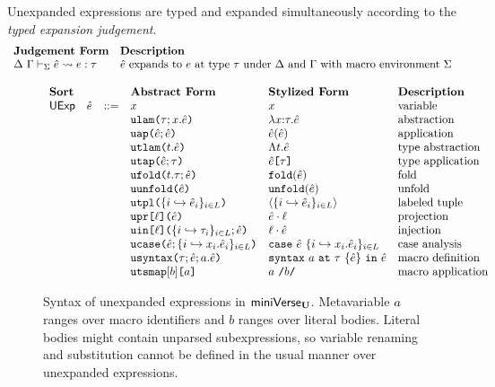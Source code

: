 Unexpanded expressions are typed and expanded simultaneously according to the \emph{typed expansion judgement}. 
\[\begin{array}{ll}
\textbf{Judgement Form} & \textbf{Description}\\
\Delta~\Gamma \vdash_{\Sigma} \hat{e} \leadsto e : \tau & \text{$\hat{e}$ expands to $e$ at type $\tau$ under $\Delta$ and $\Gamma$ with macro environment $\Sigma$}
\end{array}\]

\begin{figure}
$\begin{array}{lllllll}
\textbf{Sort} & & & \textbf{Abstract Form} & \textbf{Stylized Form} & \textbf{Description}\\
\mathsf{UExp} & \hat{e} & ::= & x & x & \text{variable}\\
&&& \texttt{ulam}\texttt{(}\tau; x.\hat{e}\texttt{)} & \lambda x{:}\tau.\hat{e} & \text{abstraction}\\
&&& \texttt{uap}\texttt{(}\hat{e}; \hat{e}\texttt{)} & \hat{e}(\hat{e}) & \text{application}\\
&&& \texttt{utlam}\texttt{(}t.\hat{e}\texttt{)} & \Lambda t.\hat{e} & \text{type abstraction}\\
&&& \texttt{utap}\texttt{(}\hat{e}; \tau\texttt{)} & \hat{e}\texttt{[}\tau\texttt{]} & \text{type application}\\
&&& \texttt{ufold}\texttt{(}t.\tau; \hat{e}\texttt{)} & \texttt{fold}(\hat{e}) & \text{fold}\\
&&& \texttt{uunfold}\texttt{(}\hat{e}\texttt{)} & \texttt{unfold}(\hat{e}) & \text{unfold}\\
&&& \texttt{utpl}\texttt{(}\{i \hookrightarrow \hat{e}_{i}\}_{i \in L}\texttt{)} & \langle \{i \hookrightarrow \hat{e}_{i}\}_{i \in L}\rangle & \text{labeled tuple}\\
&&& \texttt{upr}\texttt{[}\ell\texttt{](}\hat{e}\texttt{)} & \hat{e} \cdot \ell & \text{projection}\\
&&& \texttt{uin}\texttt{[}\ell\texttt{](}\{i \hookrightarrow \tau_{i}\}_{i \in L}; \hat{e}\texttt{)} & \ell \cdot \hat{e} & \text{injection}\\
&&& \texttt{ucase}\texttt{(}\hat{e}; \{i \hookrightarrow x_{i}.\hat{e}_{i}\}_{i \in L}\texttt{)} & \texttt{case}~\hat{e}~\{i \hookrightarrow x_{i}.\hat{e}_{i}\}_{i \in L} & \text{case analysis}\\
&&& \texttt{usyntax}\texttt{(}\tau; \hat{e}; a.\hat{e}\texttt{)} & \texttt{syntax}~a~\texttt{at}~\tau~\{\hat{e}\}~\texttt{in}~\hat{e} & \text{macro definition}\\
&&& \texttt{utsmap}[b]\texttt{[}a\texttt{]} & a~\texttt{/}b\texttt{/} & \text{macro application}
\end{array}$
\caption[Syntax of unexpanded expressions in $\miniVerseU$.]{Syntax of unexpanded expressions in $\miniVerseU$. Metavariable $a$ ranges over macro identifiers and $b$ ranges over literal bodies. Literal bodies might contain unparsed subexpressions, so variable renaming and substitution cannot be defined in the usual manner over unexpanded expressions.}
\label{fig:U-unexpanded-terms}
\end{figure}

